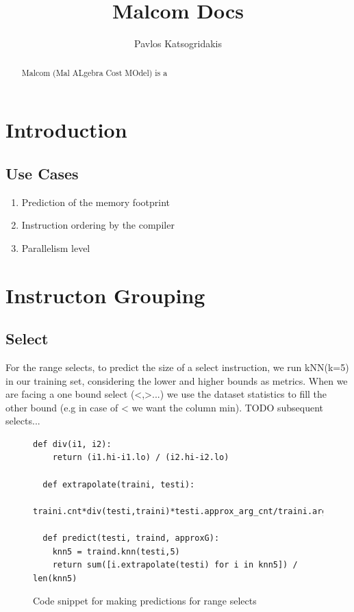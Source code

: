 \documentclass{article}
\begin{document}
\author{Pavlos Katsogridakis}
\title{Malcom Docs}

\maketitle

\begin{abstract}
Malcom (Mal ALgebra Cost MOdel) is a
\end{abstract}

\section{Introduction}
\subsection{Use Cases}
\begin{enumerate}
  \item Prediction of the memory footprint
  \item Instruction ordering by the compiler
  \item Parallelism level
\end{enumerate}

\section{Instructon Grouping}

\subsection{Select}

For the range selects, to predict the size of a select instruction,
we run kNN(k=5) in our training set, considering the lower and higher bounds
as metrics. When we are facing a one bound select (<,>...) we use the
dataset statistics to fill the other bound (e.g in case of < we want the column min).
TODO subsequent selects...

\begin{figure}[t]
\begin{lstlisting}[frame=single]
  def div(i1, i2):
    return (i1.hi-i1.lo) / (i2.hi-i2.lo)

  def extrapolate(traini, testi):
      traini.cnt*div(testi,traini)*testi.approx_arg_cnt/traini.argcnt

  def predict(testi, traind, approxG):
    knn5 = traind.knn(testi,5)
    return sum([i.extrapolate(testi) for i in knn5]) / len(knn5)
\end{lstlisting}
  \caption{Code snippet for making predictions for range selects}
  \label{sel:code}
\end{figure}
\end{document}
